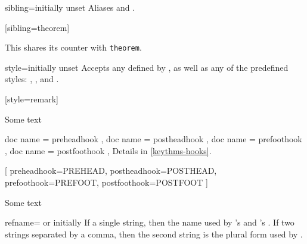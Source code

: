 \documentclass{ltxdoc}
\begin{document}
\begin{docKey}{sibling}{=}{initially unset}
Aliases  and .
\begin{tcbwritetemp}
[sibling=theorem]
\end{tcbwritetemp}
\begin{keythmscode}[withpreamble]
\begin{lemma}
This shares its counter with
\texttt{theorem}.
\end{lemma}
\end{keythmscode}
\end{docKey}

\begin{docKey}{style}{=}{initially unset}
Accepts any  defined by , as well as any of the predefined  styles: , , and .
\begin{tcbwritetemp}
[style=remark]
\end{tcbwritetemp}
\begin{keythmscode}[withpreamble]
\begin{remark}
Some text
\end{remark}
\end{keythmscode}
\end{docKey}

\begin{docKeys}[
  doc parameter = {=\meta{code}},
  doc description = initially unset,
  ]
  {
    { doc name = preheadhook },
    { doc name = postheadhook },
    { doc name = prefoothook },
    { doc name = postfoothook },
  }
Details in \autoref{keythms-hooks}.
\begin{tcbwritetemp}
[
  preheadhook=PREHEAD,
  postheadhook=POSTHEAD,
  prefoothook=PREFOOT,
  postfoothook=POSTFOOT
]
\end{tcbwritetemp}
\begin{keythmscode}[withpreamble]
\begin{test}
Some text
\end{test}
\end{keythmscode}
\end{docKeys}

\begin{docKey}{refname}{= or }{initially }
If a single string, then the name used by 's  and 's . If two strings separated by a comma, then the second string is the plural form used by .
\end{docKey}
\end{document}
